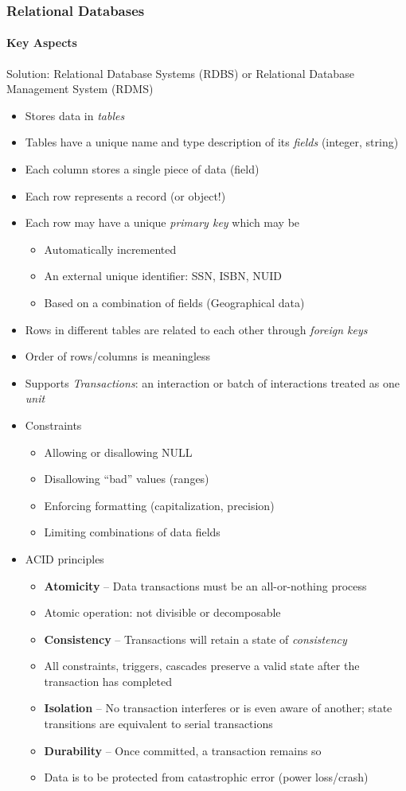 \documentclass{beamer}
\begin{document}
\begin{frame}[allowframebreaks]
    \frametitle{Relational Databases}
    \framesubtitle{Key Aspects}

Solution: Relational Database Systems (RDBS) or Relational Database Management System (RDMS)
\begin{itemize}
  \item Stores data in \emph{tables}
  \item Tables have a unique name and type description of its \emph{fields} (integer, string)
  \item Each column stores a single piece of data (field)
  \item Each row represents a record (or object!)
\framebreak
  \item Each row may have a unique \emph{primary key} which may be
  \begin{itemize}
    \item Automatically incremented
    \item An external unique identifier: SSN, ISBN, NUID
    \item Based on a combination of fields (Geographical data)
  \end{itemize}
  \item Rows in different tables are related to each other through \emph{foreign keys}
  \item Order of rows/columns is meaningless
\framebreak
  \item Supports \emph{Transactions}: an interaction or batch of interactions treated as one \emph{unit}
  \item Constraints
  \begin{itemize}
    \item Allowing or disallowing NULL
    \item Disallowing ``bad'' values (ranges)
    \item Enforcing formatting (capitalization, precision)
    \item Limiting combinations of data fields
  \end{itemize}
\framebreak
  \item ACID principles
  \begin{itemize}
    \item \textbf{Atomicity} -- Data transactions must be an all-or-nothing process
    \item Atomic operation: not divisible or decomposable
    \item \textbf{Consistency} -- Transactions will retain a state of \emph{consistency}
    \item All constraints, triggers, cascades preserve a valid state after the transaction has completed
    \item \textbf{Isolation} -- No transaction interferes or is even aware of another; state transitions are equivalent to serial transactions
    \item \textbf{Durability} -- Once committed, a transaction remains so
    \item Data is to be protected from catastrophic error (power loss/crash)
  \end{itemize}
\end{itemize}


\end{frame}
\end{document}
